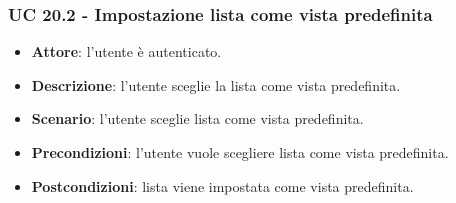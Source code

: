 \subsubsection{UC 20.2 - Impostazione lista come vista predefinita}
\begin{itemize}
    \item \textbf{Attore}: l'utente è autenticato.
    \item \textbf{Descrizione}: l'utente sceglie la lista come vista predefinita.
    \item \textbf{Scenario}: l'utente sceglie lista come vista predefinita.
    \item \textbf{Precondizioni}: l'utente vuole scegliere lista come vista predefinita.
    \item \textbf{Postcondizioni}: lista viene impostata come vista predefinita.
\end{itemize}





